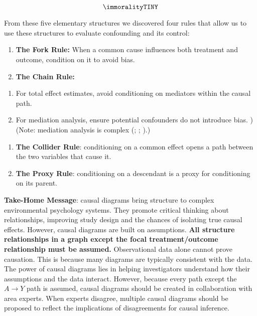 \documentclass[
  singlecolumn]{article}
\providecommand{\tightlist}{%
  \setlength{\itemsep}{0pt}\setlength{\parskip}{0pt}}\usepackage{longtable,booktabs,array}
\begin{document}
\[\immoralityTINY\]

From these five elementary structures we discovered four rules that
allow us to use these structures to evaluate confounding and its
control:

\begin{enumerate}
\def\labelenumi{\arabic{enumi}.}
\tightlist
\item
  \textbf{The Fork Rule:} When a common cause influences both treatment
  and outcome, condition on it to avoid bias.
\item
  \textbf{The Chain Rule:}
\end{enumerate}

\begin{enumerate}
\def\labelenumi{(\roman{enumi})}
\tightlist
\item
  For total effect estimates, avoid conditioning on mediators within the
  causal path.
\item
  For mediation analysis, ensure potential confounders do not introduce
  bias. )(Note: mediation analysis is complex
  (;
  ;
  ).)
\end{enumerate}

\begin{enumerate}
\def\labelenumi{\arabic{enumi}.}
\setcounter{enumi}{2}
\tightlist
\item
  \textbf{The Collider Rule}: conditioning on a common effect opens a
  path between the two variables that cause it.\\
\item
  \textbf{The Proxy Rule}: conditioning on a descendant is a proxy for
  conditioning on its parent.
\end{enumerate}

\textbf{Take-Home Message}: causal diagrams bring structure to complex
environmental psychology systems. They promote critical thinking about
relationships, improving study design and the chances of isolating true
causal effects. However, causal diagrams are built on assumptions.
\textbf{All structure relationships in a graph except the focal
treatment/outcome relationship must be assumed.} Observational data
alone cannot prove causation. This is because many diagrams are
typically consistent with the data. The power of causal diagrams lies in
helping investigators understand how their assumptions and the data
interact. However, because every path except the \(A\to Y\) path is
assumed, causal diagrams should be created in collaboration with area
experts. When experts disagree, multiple causal diagrams should be
proposed to reflect the implications of disagreements for causal
inference.
\end{document}
